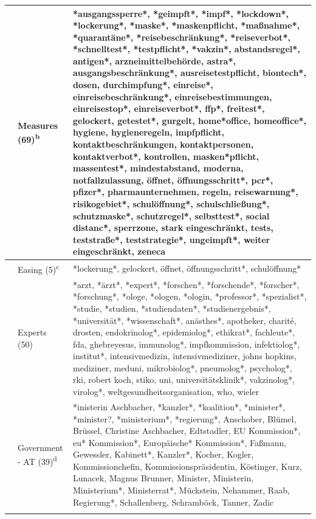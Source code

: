 \documentclass[
]{ccr}
\begin{document}
{\begin{spacing}{.9}
\begin{longtable}[]{@{}
  >{\raggedright\arraybackslash}p{.09\linewidth}
  >{\raggedright\arraybackslash}p{.12\linewidth}
  >{\raggedright\arraybackslash}p{.71\linewidth}@{}}
& Measures (69)\textsuperscript{b} & *ausgangssperre*, *geimpft*,
*impf*, *lockdown*, *lockerung*, *maske*, *maskenpflicht, *maßnahme*,
*quarantäne*, *reisebeschränkung*, *reiseverbot*, *schnelltest*,
*testpflicht*, *vakzin*, abstandsregel*, antigen*, arzneimittelbehörde,
astra*, ausgangsbeschränkung*, ausreisetestpflicht, biontech*, dosen,
durchimpfung*, einreise*, einreisebeschränkung*, einreisebestimmungen,
einreisestop*, einreiseverbot*, ffp*, freitest*, gelockert, getestet*,
gurgelt, home*office, homeoffice*, hygiene, hygieneregeln, impfpflicht,
kontaktbeschränkungen, kontaktpersonen, kontaktverbot*, kontrollen,
masken*pflicht, massentest*, mindestabstand, moderna, notfallzulassung,
öffnet, öffnungsschritt*, pcr*, pfizer*, pharmaunternehmen, regeln,
reisewarnung*, risikogebiet*, schulöffnung*, schulschließung*,
schutzmaske*, schutzregel*, selbsttest*, social distanc*, sperrzone,
stark eingeschränkt, tests, teststraße*, teststrategie*, ungeimpft*,
weiter eingeschränkt, zeneca \\ \cline{2-3}

& Easing (5)\textsuperscript{c} & *lockerung*, gelockert, öffnet,
öffnungsschritt*, schulöffnung* \\ \cline{2-3}

& Experts (50) & *arzt, *ärzt*, *expert*, *forschen*, *forschende*,
*forscher*, *forschung*, *ologe, *ologen, *ologin, *professor*,
*spezialist*, *studie, *studien, *studiendaten*, *studienergebnis*,
*universität*, *wissenschaft*, anästhes*, apotheker, charité, drosten,
endokrinolog*, epidemiolog*, ethikrat*, fachleute*, fda, ghebreyesus,
immunolog*, impfkommission, infektiolog*, institut*, intensivmedizin,
intensivmediziner, johns hopkins, mediziner, meduni, mikrobiolog*,
pneumolog*, psycholog*, rki, robert koch, stiko, uni,
universitätsklinik*, vakzinolog*, virolog*, weltgesundheitsorganisation,
who, wieler \\ \cline{2-3}

& Government - AT (39)\textsuperscript{d} &
*inisterin Aschbacher, *kanzler*,
*koalition*, *minister*, *minister?, *ministerium*, *regierung*,
Anschober, Blümel, Brüssel, Christine Aschbacher, Edtstadler, EU
Kommission*, eu* Kommission*, Europäische* Kommission*, Faßmann,
Gewessler, Kabinett*, Kanzler*, Kocher, Kogler, Kommissionchefin,
Kommissionspräsidentin, Köstinger, Kurz, Lunacek, Magnus Brunner,
Minister, Ministerin, Ministerium*, Ministerrat*, Mückstein, Nehammer,
Raab, Regierung*, Schallenberg, Schramböck, Tanner, Zadic \\ \cline{2-3}


\end{longtable}
\end{spacing}}
\end{document}
